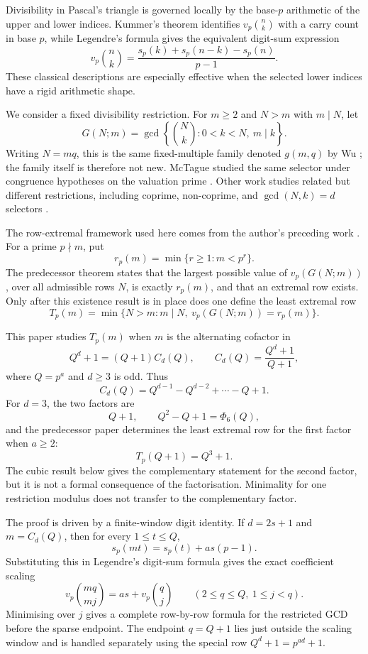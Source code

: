 \documentclass[11pt]{article}
\theoremstyle{definition}
\theoremstyle{remark}
\begin{document}
Divisibility in Pascal's triangle is governed locally by the base-\(p\)
arithmetic of the upper and lower indices.  Kummer's theorem identifies
\(v_p\binom nk\) with a carry count in base \(p\), while Legendre's formula
gives the equivalent digit-sum expression
\[
  v_p\binom nk
  =
  \frac{s_p(k)+s_p(n-k)-s_p(n)}{p-1}.
\]
These classical descriptions are especially effective when the selected lower
indices have a rigid arithmetic shape.

We consider a fixed divisibility restriction.  For \(m\ge2\) and \(N>m\)
with \(m\mid N\), let
\[
  G(N;m)=\gcd\left\{\binom Nk:0<k<N,\ m\mid k\right\}.
\]
Writing \(N=mq\), this is the same fixed-multiple family denoted \(g(m,q)\)
by Wu \cite{Wu2026}; the family itself is therefore not new.  McTague studied
the same selector under congruence hypotheses on the valuation prime
\cite{McTague2017}.  Other work studies related but different restrictions,
including coprime, non-coprime, and \(\gcd(N,k)=d\) selectors
\cite{Hong2016,ChiuYuanZhou2023,ChungYangZhou2025,ChungYang2026}.

The row-extremal framework used here comes from the author's preceding work
\cite{FairfaxBallExtremes2026}.  For a prime \(p\nmid m\), put
\[
  r_p(m)=\min\{r\ge1:m<p^r\}.
\]
The predecessor theorem states that the largest possible value of
\(v_p(G(N;m))\), over all admissible rows \(N\), is exactly \(r_p(m)\), and
that an extremal row exists.  Only after this existence result is in place does
one define the least extremal row
\[
  T_p(m)=
  \min\{N>m:m\mid N,\ v_p(G(N;m))=r_p(m)\}.
\]

This paper studies \(T_p(m)\) when \(m\) is the alternating cofactor in
\[
  Q^d+1=(Q+1)C_d(Q),
  \qquad
  C_d(Q)=\frac{Q^d+1}{Q+1},
\]
where \(Q=p^a\) and \(d\ge3\) is odd.  Thus
\[
  C_d(Q)=Q^{d-1}-Q^{d-2}+\cdots-Q+1.
\]
For \(d=3\), the two factors are
\[
  Q+1,\qquad Q^2-Q+1=\Phi_6(Q),
\]
and the predecessor paper determines the least extremal row for the first
factor when \(a\ge2\):
\[
  T_p(Q+1)=Q^3+1.
\]
The cubic result below gives the complementary statement for the second factor,
but it is not a formal consequence of the factorisation.  Minimality for one
restriction modulus does not transfer to the complementary factor.

The proof is driven by a finite-window digit identity.  If \(d=2s+1\) and
\(m=C_d(Q)\), then for every \(1\le t\le Q\),
\[
  s_p(mt)=s_p(t)+as(p-1).
\]
Substituting this in Legendre's digit-sum formula gives the exact coefficient
scaling
\[
  v_p\binom{mq}{mj}
  =
  as+v_p\binom qj
  \qquad(2\le q\le Q,\ 1\le j<q).
\]
Minimising over \(j\) gives a complete row-by-row formula for the restricted
GCD before the sparse endpoint.  The endpoint \(q=Q+1\) lies just outside the
scaling window and is handled separately using the special row
\(Q^d+1=p^{ad}+1\).
\end{document}
